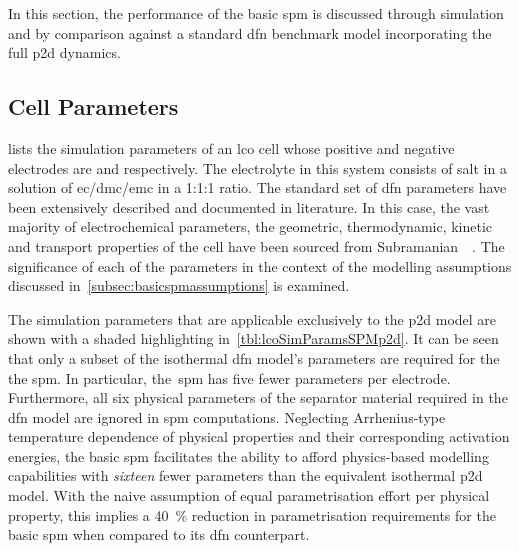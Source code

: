 
In this  section, the performance  of the  basic \gls{spm} is  discussed through
simulation  and  by comparison  against  a  standard \gls{dfn}  benchmark  model
incorporating the full \gls{p2d} dynamics.

\subsection{Cell Parameters}


 lists  the simulation  parameters of  an \gls{lco}
cell  whose positive  and negative  electrodes are   and  
respectively. The electrolyte  in this system consists of   salt in a
solution  of \gls{ec}/\gls{dmc}/\gls{emc}  in a  1:1:1 ratio.  The standard  set
of  \gls{dfn}  parameters have  been  extensively  described and  documented  in
literature.  In this  case,  the vast  majority  of electrochemical  parameters,
\viz{} the  geometric, thermodynamic,  kinetic and  transport properties  of the
cell  have  been  sourced from  Subramanian~\etal{}~\cite{Subramanian2009}.  The
significance  of  each  of  the  parameters in  the  context  of  the  modelling
assumptions discussed in~\cref{subsec:basicspmassumptions} is examined.

The simulation parameters that are applicable exclusively to the \gls{p2d} model
are shown with a shaded highlighting in~\cref{tbl:lcoSimParamsSPMp2d}. It can be
seen  that only  a subset  of the  isothermal \gls{dfn}  model's parameters  are
required  for the  the \gls{spm}.  In particular,  the~\gls{spm} has  five fewer
parameters  per  electrode. Furthermore,  all  six  physical parameters  of  the
separator  material required  in the  \gls{dfn} model  are ignored  in \gls{spm}
computations.  Neglecting  Arrhenius-type  temperature  dependence  of  physical
properties  and their  corresponding  activation energies,  the basic  \gls{spm}
facilitates  the ability  to  afford physics-based  modelling capabilities  with
\emph{sixteen} fewer parameters than  the equivalent isothermal \gls{p2d} model.
With the naive assumption of equal parametrisation effort per physical property,
this implies  a \SI{40}{\percent} reduction in  parametrisation requirements for
the basic \gls{spm} when compared to its \gls{dfn} counterpart.

